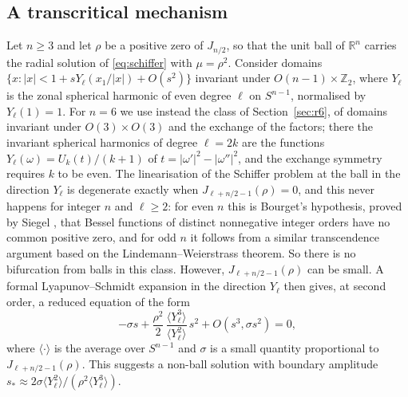 \documentclass[11pt]{amsart}
\theoremstyle{definition}
\theoremstyle{remark}
\numberwithin{equation}{section}
\newcommand{\R}{\mathbb{R}}
\newcommand{\Z}{\mathbb{Z}}
\begin{document}
\subsection{A transcritical mechanism}\label{subsec:mechanism}
Let $n\geq3$ and let $\rho$ be a positive zero of $J_{n/2}$, so that the unit ball of $\R^n$ carries the radial solution of \eqref{eq:schiffer} with $\mu=\rho^2$. Consider domains $\{x:|x|<1+sY_\ell(x_1/|x|)+O(s^2)\}$ invariant under $O(n-1)\times\Z_2$, where $Y_\ell$ is the zonal spherical harmonic of even degree $\ell$ on $S^{n-1}$, normalised by $Y_\ell(1)=1$. For $n=6$ we use instead the class of Section~\ref{sec:r6}, of domains invariant under $O(3)\times O(3)$ and the exchange of the factors; there the invariant spherical harmonics of degree $\ell=2k$ are the functions $Y_\ell(\omega)=U_k(t)/(k+1)$ of $t=|\omega'|^2-|\omega''|^2$, and the exchange symmetry requires $k$ to be even. The linearisation of the Schiffer problem at the ball in the direction $Y_\ell$ is degenerate exactly when $J_{\ell+n/2-1}(\rho)=0$, and this never happens for integer $n$ and $\ell\geq2$: for even $n$ this is Bourget's hypothesis, proved by Siegel \cite{Sie29}, that Bessel functions of distinct nonnegative integer orders have no common positive zero, and for odd $n$ it follows from a similar transcendence argument based on the Lindemann--Weierstrass theorem. So there is no bifurcation from balls in this class. However, $J_{\ell+n/2-1}(\rho)$ can be small. A formal Lyapunov--Schmidt expansion in the direction $Y_\ell$ then gives, at second order, a reduced equation of the form
\[
-\sigma s+\frac{\rho^2}2\,\frac{\langle Y_\ell^3\rangle}{\langle Y_\ell^2\rangle}\,s^2+O(s^3,\sigma s^2)=0,
\]
where $\langle\cdot\rangle$ is the average over $S^{n-1}$ and $\sigma$ is a small quantity proportional to $J_{\ell+n/2-1}(\rho)$. This suggests a non-ball solution with boundary amplitude $s_*\approx2\sigma\langle Y_\ell^2\rangle/(\rho^2\langle Y_\ell^3\rangle)$.
\end{document}
